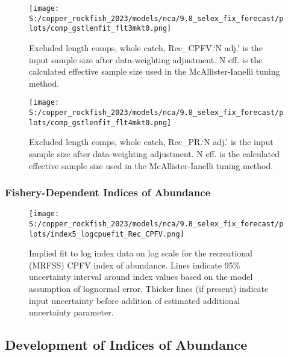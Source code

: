 \documentclass[11pt,
  english,
  letterpaper,
]{article}
\begin{document}
\begin{figure}
\centering
\texttt{[image: S:/copper\_rockfish\_2023/models/nca/9.8\_selex\_fix\_forecast/plots/comp\_gstlenfit\_flt3mkt0.png]}
\caption{Excluded length comps, whole catch, Rec\_CPFV.`N adj.' is the input sample size after data-weighting adjustment. N eff. is the calculated effective sample size used in the McAllister-Ianelli tuning method.\label{fig:comp_gstlenfit_flt3mkt0}}
\end{figure}

\begin{figure}
\centering
\texttt{[image: S:/copper\_rockfish\_2023/models/nca/9.8\_selex\_fix\_forecast/plots/comp\_gstlenfit\_flt4mkt0.png]}
\caption{Excluded length comps, whole catch, Rec\_PR.`N adj.' is the input sample size after data-weighting adjustment. N eff. is the calculated effective sample size used in the McAllister-Ianelli tuning method.\label{fig:comp_gstlenfit_flt4mkt0}}
\end{figure}

\newpage

\hypertarget{fishery-dependent-indices-of-abundance}{%
\subsubsection{Fishery-Dependent Indices of Abundance}\label{fishery-dependent-indices-of-abundance}}

\begin{figure}
\centering
\texttt{[image: S:/copper\_rockfish\_2023/models/nca/9.8\_selex\_fix\_forecast/plots/index5\_logcpuefit\_Rec\_CPFV.png]}
\caption{Implied fit to log index data on log scale for the recreational (MRFSS) CPFV index of abundance. Lines indicate 95\% uncertainty interval around index values based on the model assumption of lognormal error. Thicker lines (if present) indicate input uncertainty before addition of estimated additional uncertainty parameter.\label{fig:mrfss-cpfv-index-fit}}
\end{figure}

\pagebreak

\hypertarget{development-of-indices-of-abundance}{%
\subsection{Development of Indices of Abundance}\label{development-of-indices-of-abundance}}
\end{document}
